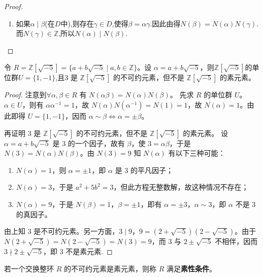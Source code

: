 \documentclass[../../main.tex]{subfiles}%
\begin{document}
\begin{proof}
\begin{enumerate}[(1)]
\item 如果$\alpha \mid \beta$(在$D$中),则存在$\gamma \in D$,使得$\beta = \alpha\gamma$.因此由得$N(\beta) = N(\alpha)N(\gamma)$.而$N(\gamma) \in \mathbb{Z}$,所以$N(\alpha) \mid N(\beta)$.
\end{enumerate}
\end{proof}

\begin{example}\label{example:不可约元素不是素元素的例子}
令 \( R = \mathbb{Z}[\sqrt{-5}] = \{a + b\sqrt{-5} \mid a, b \in \mathbb{Z}\} \)。设 \( \alpha = a + b\sqrt{-5} \)，则$\mathbb{Z}[\sqrt{-5}]$的单位群$U=\{1,-1\}$,且\( 3 \) 是 \( \mathbb{Z}[\sqrt{-5}] \) 的不可约元素，但不是 \( \mathbb{Z}[\sqrt{-5}] \) 的素元素。
\end{example}
\begin{proof}
注意到\( \forall \alpha, \beta \in R \) 有 \( N(\alpha\beta) = N(\alpha)N(\beta) \)。
先求 \( R \) 的单位群 \( U \)。\( \alpha \in U \)，则有 \( \alpha\alpha^{-1} = 1 \)，故 \( N(\alpha)N(\alpha^{-1}) = N(1) = 1 \)，故 \( N(\alpha) = 1 \)。由此即得 \( U = \{1, -1\} \)，因而 \( \alpha \sim \beta \iff \alpha = \pm\beta \)。

再证明 \( 3 \) 是 \( \mathbb{Z}[\sqrt{-5}] \) 的不可约元素，但不是 \( \mathbb{Z}[\sqrt{-5}] \) 的素元素。
设 \( \alpha = a + b\sqrt{-5} \) 是 \( 3 \) 的一个因子，故有 \( \beta \)，使 \( 3 = \alpha\beta \)，于是 \( N(3) = N(\alpha)N(\beta) \)。由 \( N(3) = 9 \) 知 \( N(\alpha) \) 有以下三种可能：
\begin{enumerate}[(1)]
\item \( N(\alpha) = 1 \)，则 \( \alpha = \pm 1 \)，即 \( \alpha \) 是 \( 3 \) 的平凡因子；
\item \( N(\alpha) = 3 \)，于是 \( a^2 + 5b^2 = 3 \)，但此方程无整数解，故这种情况不存在；
\item \( N(\alpha) = 9 \)，于是 \( N(\beta) = 1 \)，\( \beta = \pm 1 \)，即有 \( \alpha = \pm 3 \)，\( \alpha \sim 3 \)，即 \( \alpha \) 不是 \( 3 \) 的真因子。
\end{enumerate}
由上知 \( 3 \) 是不可约元素。另一方面，\( 3 \mid 9 \)，\( 9 = (2 + \sqrt{-5})(2 - \sqrt{-5}) \)。由于 \( N(2 + \sqrt{-5}) = N(2 - \sqrt{-5}) = N(3) = 9 \)，而 \( 3 \) 与 \( 2 \pm \sqrt{-5} \) 不相伴，因而 \( 3 \nmid 2 \pm \sqrt{-5} \)，即 \( 3 \) 不是素元素.
\end{proof}

\begin{definition}
若一个交换整环 \( R \) 的不可约元素是素元素，则称 \( R \) 满足\textbf{素性条件}。
\end{definition}
\end{document}
